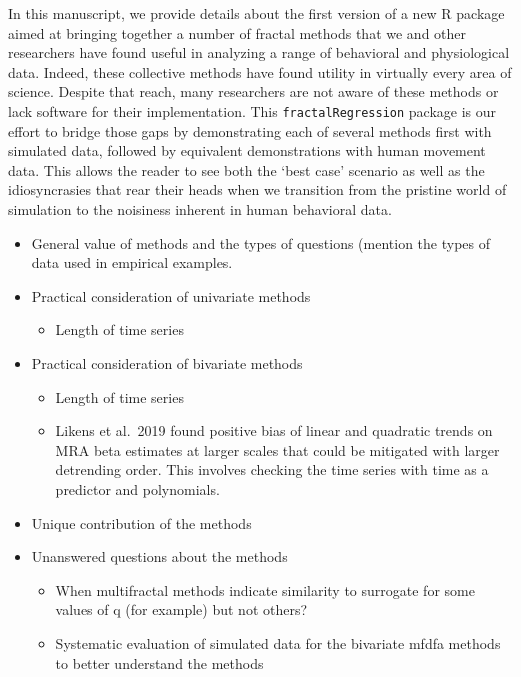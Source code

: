 \documentclass[
  man]{apa6}
\providecommand{\tightlist}{%
  \setlength{\itemsep}{0pt}\setlength{\parskip}{0pt}}
\begin{document}
In this manuscript, we provide details about the first version of a new
R package aimed at bringing together a number of fractal methods that we
and other researchers have found useful in analyzing a range of
behavioral and physiological data. Indeed, these collective methods have
found utility in virtually every area of science. Despite that reach,
many researchers are not aware of these methods or lack software for
their implementation. This \texttt{fractalRegression} package is our effort to
bridge those gaps by demonstrating each of several methods first with
simulated data, followed by equivalent demonstrations with human
movement data. This allows the reader to see both the `best case'
scenario as well as the idiosyncrasies that rear their heads when we
transition from the pristine world of simulation to the noisiness
inherent in human behavioral data.

\begin{itemize}
\item
  General value of methods and the types of questions (mention the
  types of data used in empirical examples.
\item
  Practical consideration of univariate methods

  \begin{itemize}
  \tightlist
  \item
    Length of time series
  \end{itemize}
\item
  Practical consideration of bivariate methods

  \begin{itemize}
  \item
    Length of time series
  \item
    Likens et al.~2019 found positive bias of linear and quadratic
    trends on MRA beta estimates at larger scales that could be
    mitigated with larger detrending order. This involves checking
    the time series with time as a predictor and polynomials.
  \end{itemize}
\item
  Unique contribution of the methods
\item
  Unanswered questions about the methods

  \begin{itemize}
  \item
    When multifractal methods indicate similarity to surrogate for
    some values of q (for example) but not others?
  \item
    Systematic evaluation of simulated data for the bivariate mfdfa
    methods to better understand the methods
  \end{itemize}
\end{itemize}
\end{document}
